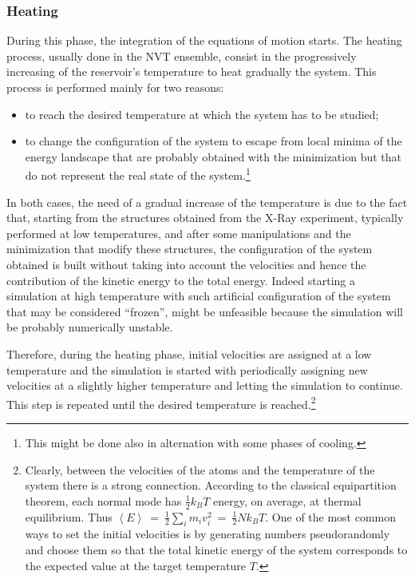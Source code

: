 \subsubsection{Heating}
During this phase, the integration of the equations of motion starts.
The heating process, usually done in the NVT ensemble, consist in the progressively increasing of  the reservoir's temperature to heat gradually the system. This process is performed mainly for two reasons:
\begin{itemize}
\item to reach the desired temperature at which the system has to be studied;
\item to change the configuration of the system to escape from local minima of the energy landscape that are probably obtained with the minimization but that do not represent the real state of the system.\footnote{This might be done also in alternation with some phases of cooling.}
\end{itemize}
In both cases, the need of a gradual increase of the temperature is due to the fact that, starting from the structures obtained from the X-Ray experiment, typically performed at low temperatures, and after some manipulations and the minimization that modify these structures, the configuration of the system obtained is built without taking into account the velocities and hence the contribution of the kinetic energy to the total energy. Indeed starting a simulation at high temperature with such artificial configuration of the system that may be considered ``frozen'', might be unfeasible because the simulation will be probably numerically unstable.

Therefore, during the heating phase, initial velocities are assigned at a low temperature and the simulation is started with periodically assigning new velocities at a slightly higher temperature and letting the simulation to continue. This step is repeated until the desired temperature is reached.\footnote{Clearly, between the velocities of the atoms and the temperature of the system there is a strong connection. According to the classical equipartition theorem, each normal mode has $\frac{1}{2} k_B T$ energy, on average, at thermal equilibrium. Thus $\left< E \right> \:=\: \frac{1}{2}\sum_i m_i v_i^2 \:=\: \frac{1}{2} N k_B T$.
One of the most common ways to set the initial velocities is by generating numbers pseudorandomly and choose them so that the total kinetic energy of the system corresponds to the expected value at the target temperature $T$.} 


